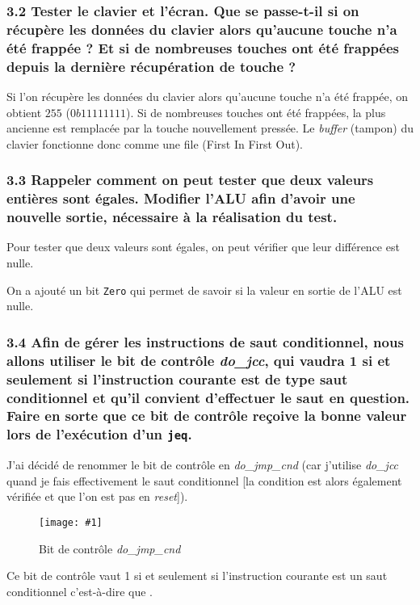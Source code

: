 \documentclass[twoside, 12pt, a4paper]{article}
\newcommand{\cf}[3]{
    \begin{figure}[!h]
        \centering
        \texttt{[image: \#1]}
    \caption{#3}\label{Fig:#1}
    \end{figure}
}
\newcommand{\hcf}[2]{\cf{#1}{.75}{#2}}
\begin{document}
        \subsubsection*{\textbf{3.2} Tester le clavier et l'écran. Que se passe-t-il si on récupère les données du clavier alors qu'aucune touche n'a été frappée ? Et si de nombreuses touches ont été frappées depuis la dernière récupération de touche ?}

Si l'on récupère les données du clavier alors qu'aucune touche n'a été frappée, on obtient $255$ ($0b11111111$).
Si de nombreuses touches ont été frappées, la plus ancienne est remplacée par la touche nouvellement pressée.
Le \textit{buffer} (tampon) du clavier fonctionne donc comme une file (First In First Out).

        \subsubsection*{\textbf{3.3} Rappeler comment on peut tester que deux valeurs entières sont égales. Modifier l'ALU afin d'avoir une nouvelle sortie, nécessaire à la réalisation du test.}

Pour tester que deux valeurs sont égales, on peut vérifier que leur différence est nulle.

On a ajouté un bit \texttt{Zero} qui permet de savoir si la valeur en sortie de l'ALU est nulle.

        \subsubsection*{\textbf{3.4} Afin de gérer les instructions de saut conditionnel, nous allons utiliser le bit de contrôle \textit{do\_jcc}, qui vaudra 1 si et seulement si l'instruction courante est de type saut conditionnel et qu'il convient d'effectuer le saut en question. \\
        Faire en sorte que ce bit de contrôle reçoive la bonne valeur lors de l'exécution d'un \texttt{jeq}.}

J'ai décidé de renommer le bit de contrôle en \textit{do\_jmp\_cnd} (car j'utilise \textit{do\_jcc} quand je fais effectivement le saut conditionnel [la condition est alors également vérifiée et que l'on est pas en \textit{reset}]).

\hcf{do_jmp_cnd.png}{Bit de contrôle \textit{do\_jmp\_cnd}}

Ce bit de contrôle vaut 1 si et seulement si l'instruction courante est un saut conditionnel c'est-à-dire que .
\end{document}
